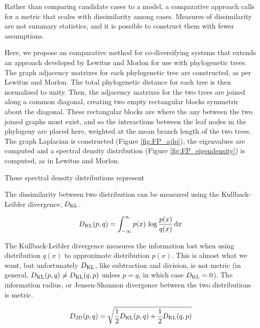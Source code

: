 Rather than comparing candidate cases to a model, a comparative approach calls for a metric that scales with dissimilarity among cases. Measures of dissimilarity are not summary statistics, and it is possible to construct them with fewer assumptions. 



Here, we propose an comparative method for co-diversifying systems that extends an approach developed by Lewitus and Morlon \cite{lewitus2015characterizing} for use with phylogenetic trees. The graph adjacency matrixes for each phylogenetic tree are constructed, as per Lewitus and Morlon. The total phylogenetic distance for each tree is then normalized to unity. Then, the adjacency matrixes for the two trees are joined along a common diagonal, creating two empty rectangular blocks symmetric about the diagonal. These rectangular blocks are where the any between the two joined graphs must exist, and so the interactions between the leaf nodes in the phylogeny are placed here, weighted at the mean branch length of the two trees. The graph Laplacian is constructed (Figure \ref{fig:FP_ajlp}), the eigenvalues are computed and a spectral density distribution (Figure \ref{fig:FP_eigendensity}) is computed, as in Lewitus and Morlon. 



These spectral density distributions represent 

The dissimilarity between two distribution can be measured using the Kullback-Leibler divergence, $D_{\rm KL}$. 

\begin{equation}
    D_{\rm KL}( p, q ) = \int_{-\infty}^\infty p(x) \, \log\frac{p(x)}{q(x)} \, {\rm d}x
\end{equation}

\noindent The Kullback-Leibler divergence measures the information lost when using distribution $q(x)$ to approximate distribution $p(x)$. This is almost what we want, but unfortunately $D_{\rm KL}$, like subtraction and division, is not metric (in general, $D_{\rm KL}(p,q) \neq D_{\rm KL}(q,p)$ unless $p=q$, in which case $D_{\rm KL}=0$). The information radius, or Jensen-Shannon divergence between the two distributions is metric.

\begin{equation}
    D_{\rm JD}( p, q ) = \sqrt{ \frac{1}{2} D_{\rm KL}( p, q ) + \frac{1}{2} D_{\rm KL}( q, p ) }
\end{equation}

